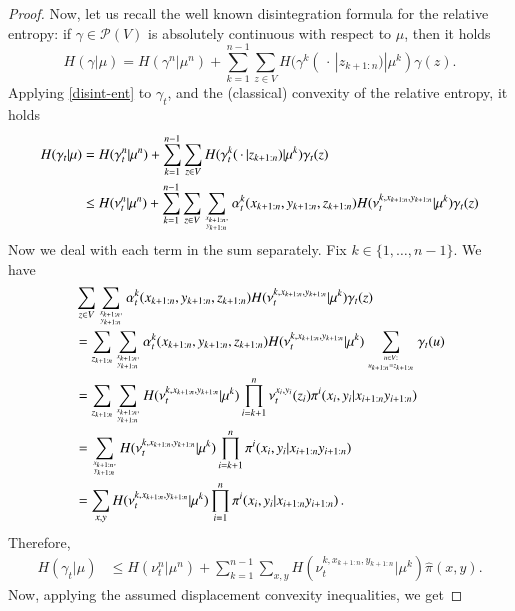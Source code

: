 \documentclass[11pt]{amsart}
\numberwithin{equation}{section}
\begin{document}
\begin{proof}
Now, let us recall the well known disintegration formula for the relative entropy: if $\gamma \in \mathcal{P}(V)$ is absolutely continuous with respect to $\mu$, then it holds
\begin{equation}\label{disint-ent}
H(\gamma|\mu) = H(\gamma^n | \mu^n) + \sum_{k=1}^{n-1} \sum_{z\in V}  H(\gamma^{k}(\,\cdot\,| z_{k+1:n}) | \mu^{k}) \gamma(z).
\end{equation}
Applying \eqref{disint-ent} to $\gamma_{t}$, and the (classical) convexity of the relative entropy, it holds
\begin{align*}
H(\gamma_{t}|\mu)
&= 
H(\gamma_{t}^n | \mu^n) + \sum_{k=1}^{n-1} \sum_{z\in V}  H(\gamma_{t}^{k}(\,\cdot\,| z_{k+1:n}) | \mu^{k}) \gamma_{t}(z)\\
&\leq 
H(\nu_{t}^n |\mu^n) +\sum_{k=1}^{n-1} \sum_{z\in V}
\sum_{\genfrac{}{}{0pt}{}{x_{k+1:n},}{ y_{k+1:n}}} 
\alpha_{t}^k(x_{k+1:n},y_{k+1:n},z_{k+1:n}) H(\nu_{t}^{k, x_{k+1:n},y_{k+1:n}} | \mu^{k}) \gamma_{t}(z)
\end{align*}
Now we deal with each term in the sum separately. Fix $k \in \{1,\dots,n-1\}$. We have
\begin{align*}
& \sum_{z\in V}
\sum_{\genfrac{}{}{0pt}{}{x_{k+1:n},}{ y_{k+1:n}}} 
\alpha_{t}^k(x_{k+1:n},y_{k+1:n},z_{k+1:n}) H(\nu_{t}^{k, x_{k+1:n},y_{k+1:n}} | \mu^{k}) \gamma_{t}(z) \\
&= 
\sum_{z_{k+1:n}} \sum_{\genfrac{}{}{0pt}{}{x_{k+1:n},}{ y_{k+1:n}}} \alpha_{t}^k(x_{k+1:n},y_{k+1:n},z_{k+1:n})  
H(\nu_{t}^{k, x_{k+1:n},y_{k+1:n}} | \mu^{k}) 
 \sum_{\genfrac{}{}{0pt}{}{u\in V :}{u_{k+1:n}=z_{k+1:n}}}\gamma_{t}(u)\\
& = 
\sum_{z_{k+1:n}}\sum_{\genfrac{}{}{0pt}{}{x_{k+1:n},}{ y_{k+1:n}}} H(\nu_{t}^{k, x_{k+1:n},y_{k+1:n}} | \mu^{k}) \prod_{i=k+1}^n \nu_{t}^{x_{i},y_{i}}(z_{i})\pi^i(x_{i},y_{i} | x_{i+1:n} y_{i+1:n})\\
& = 
\sum_{\genfrac{}{}{0pt}{}{x_{k+1:n},}{ y_{k+1:n}}} H(\nu_{t}^{k, x_{k+1:n},y_{k+1:n}} | \mu^{k}) \prod_{i=k+1}^n\pi^i(x_{i},y_{i} | x_{i+1:n} y_{i+1:n}) \\
& =
\sum_{x, y} H(\nu_{t}^{k, x_{k+1:n},y_{k+1:n}} | \mu^{k}) \prod_{i=1}^n\pi^i(x_{i},y_{i} | x_{i+1:n} y_{i+1:n})\,.
\end{align*}
Therefore,
\begin{align*}
H(\gamma_{t}|\mu) 
& \leq H(\nu_{t}^n |\mu^n) +\sum_{k=1}^{n-1} \sum_{x, y} H(\nu_{t}^{k, x_{k+1:n},y_{k+1:n}} | \mu^{k}) \hat{\pi}(x,y).
\end{align*}
Now, applying the assumed displacement convexity inequalities, we get

\end{proof}
\end{document}
